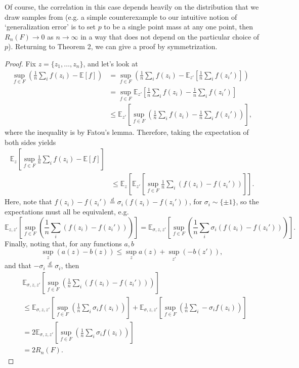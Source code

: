 \documentclass[11pt]{article}
\newcommand{\ex}[1]{\mathbb{E}\left[{#1}\right]}
\newcommand{\exu}[2]{\mathbb{E}_{#1}\left[{#2}\right]}
\newcommand{\eqd}{\overset{d}{=}}
\begin{document}
Of course, the correlation in this case depends heavily on the
distribution that we draw samples from (e.g. a simple counterexample
to our intuitive notion of `generalization error' is to set $p$ to be
a single point mass at any one point, then $R_n(F)\to 0$ as
$n\to\infty$ in a way that does not depend on the particular choice of
$p$). Returning to Theorem 2, we can give a proof by symmetrization.
\begin{proof}
  Fix $z = \{z_1, \dots, z_n\}$, and let's look at
  \begin{align*}
    \sup_{f \in F}\left( \frac1n \sum_i f(z_i) - \ex{f}\right) &= \sup_{f \in F} \left(\frac1n \sum_i f(z_i) - \exu{z'}{\frac1n \sum_i f(z_i')}\right)\\
                                                               &= \sup_{f \in F} \exu{z'}{\frac1n \sum_i f(z_i) - \frac1n \sum_i f(z_i')}\\
                                                               &\le \exu{z'}{\sup_{f \in F} \left(\frac1n \sum_i f(z_i) - \frac1n \sum_i f(z_i')\right)},
  \end{align*}
  where the inequality is by Fatou's lemma. Therefore, taking the expectation of both sides yields
  \begin{align*}
    \exu{z}{\sup_{f \in F} \frac1n \sum_i f(z_i) - \ex{f}}\\
    &\le \exu{z}{\exu{z'}{\sup_{f \in F}\frac1n \sum_i \left(f(z_i) - f(z_i')\right)}}.
  \end{align*}
  Here, note that $f(z_i) - f(z_i') \eqd \sigma_i(f(z_i) - f(z_i'))$, for $\sigma_i \sim \{\pm 1\}$, so the expectations must all be equivalent, e.g.
  \[
    \exu{z, z'}{\sup_{f \in F}\left(\frac1n \sum_i \left(f(z_i) - f(z_i')\right)\right)} = \exu{\sigma, z, z'}{\sup_{f \in F}\left( \frac1n \sum_i \sigma_i\left(f(z_i) - f(z_i')\right)\right)}. 
  \]
  Finally, noting that, for any functions $a, b$
  \[
    \sup_z \left(a(z) - b(z)\right) \le \sup_z a(z) + \sup_{z'} (-b(z')),
  \]
  and that $-\sigma_i \eqd \sigma_i$, then
  \begin{align*}
    & \exu{\sigma, z, z'}{\sup_{f \in F}\left( \frac1n \sum_i \left(f(z_i) - f(z_i')\right)\right)} \\
    &\le \exu{\sigma, z, z'}{\sup_{f \in F}\left( \frac1n \sum_i \sigma_if(z_i)\right)} + \exu{\sigma, z, z'}{\sup_{f \in F}\left( \frac1n \sum_i -\sigma_if(z_i)\right)} \\
                                                                                                  &= 2 \exu{\sigma, z, z'}{\sup_{f \in F}\left( \frac1n \sum_i \sigma_if(z_i)\right)} \\
                                                                                                  &= 2 R_n(F).
  \end{align*}
\end{proof}
\end{document}
